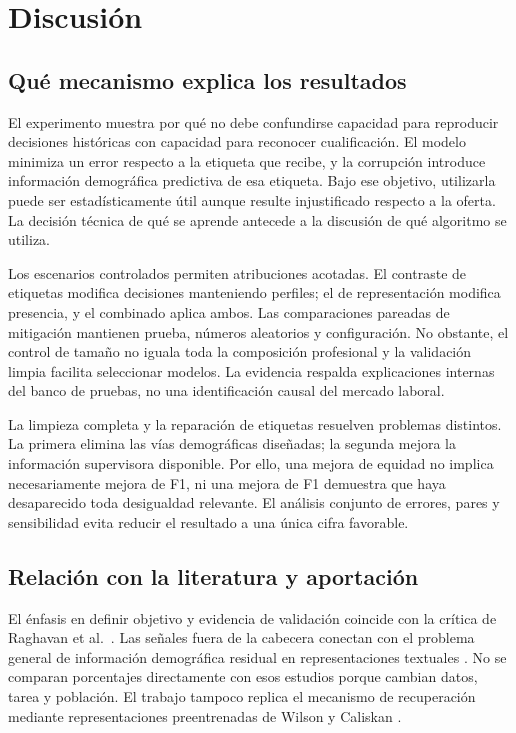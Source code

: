 \chapter{Discusión}
\section{Qué mecanismo explica los resultados}
El experimento muestra por qué no debe confundirse capacidad para reproducir decisiones históricas con capacidad para reconocer cualificación. El modelo minimiza un error respecto a la etiqueta que recibe, y la corrupción introduce información demográfica predictiva de esa etiqueta. Bajo ese objetivo, utilizarla puede ser estadísticamente útil aunque resulte injustificado respecto a la oferta. La decisión técnica de qué se aprende antecede a la discusión de qué algoritmo se utiliza.

Los escenarios controlados permiten atribuciones acotadas. El contraste de etiquetas modifica decisiones manteniendo perfiles; el de representación modifica presencia, y el combinado aplica ambos. Las comparaciones pareadas de mitigación mantienen prueba, números aleatorios y configuración. No obstante, el control de tamaño no iguala toda la composición profesional y la validación limpia facilita seleccionar modelos. La evidencia respalda explicaciones internas del banco de pruebas, no una identificación causal del mercado laboral.

La limpieza completa y la reparación de etiquetas resuelven problemas distintos. La primera elimina las vías demográficas diseñadas; la segunda mejora la información supervisora disponible. Por ello, una mejora de equidad no implica necesariamente mejora de F1, ni una mejora de F1 demuestra que haya desaparecido toda desigualdad relevante. El análisis conjunto de errores, pares y sensibilidad evita reducir el resultado a una única cifra favorable.

\section{Relación con la literatura y aportación}
El énfasis en definir objetivo y evidencia de validación coincide con la crítica de Raghavan et al.\ \cite{raghavan2020}. Las señales fuera de la cabecera conectan con el problema general de información demográfica residual en representaciones textuales \cite{dearteaga2019}. No se comparan porcentajes directamente con esos estudios porque cambian datos, tarea y población. El trabajo tampoco replica el mecanismo de recuperación mediante representaciones preentrenadas de Wilson y Caliskan \cite{wilson2024}.

